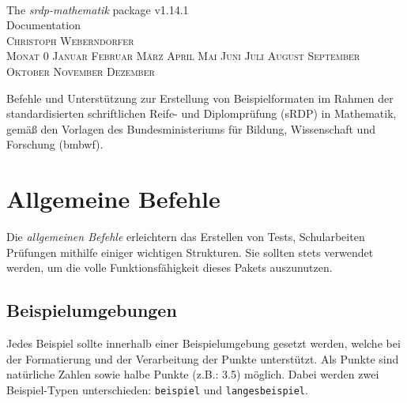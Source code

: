 \documentclass[a4paper,12pt]{article}
\makeatletter
\renewcommand*\tableofcontents{\@starttoc{toc}}
\newcommand{\Monat}{%
\ifcase\month
 Monat 0 \or Januar \or Februar \or März  \or April \or Mai \or Juni \or Juli%
 \or August \or September \or Oktober \or November \or Dezember
\fi}
\makeatother
\begin{document}
\begin{titlepage}
\thispagestyle{empty}
\begin{center}
~

\vfill

\Huge The \textit{srdp-mathematik} package v1.14.1\\[1cm]

Documentation \\ [1cm]

\flushright
\textsc{\large Christoph Weberndorfer} \\[-0.5cm]
\textsc{\large \Monat~\the\year} \\ 
\vspace{\baselineskip}

\vfill

\centering
\normalsize 
Befehle und Unterstützung zur Erstellung von Beispielformaten im Rahmen der standardisierten schriftlichen Reife- und Diplomprüfung (sRDP) in Mathematik, gemäß den Vorlagen des Bundesministeriums für Bildung, Wissenschaft und Forschung (bmbwf). 
\vfill 

\begingroup
\let\cleardoublepage\relax
\let\clearpage\relax
\normalsize \tableofcontents
\endgroup

\leer


\end{center}


\end{titlepage}


\section{Allgemeine Befehle}
Die \textit{allgemeinen Befehle} erleichtern das Erstellen von Tests, Schularbeiten Prüfungen mithilfe einiger wichtigen Strukturen. Sie sollten stets verwendet werden, um die volle Funktionsfähigkeit dieses Pakets auszunutzen. 
\vspace{1cm}

\subsection{Beispielumgebungen}

Jedes Beispiel sollte innerhalb einer Beispielumgebung gesetzt werden, welche bei der Formatierung und der Verarbeitung der Punkte unterstützt. Als Punkte sind natürliche Zahlen sowie halbe Punkte (z.B.: 3.5) möglich. Dabei werden zwei Beispiel-Typen unterschieden: \texttt{beispiel} und \texttt{langesbeispiel}.   
\end{document}
